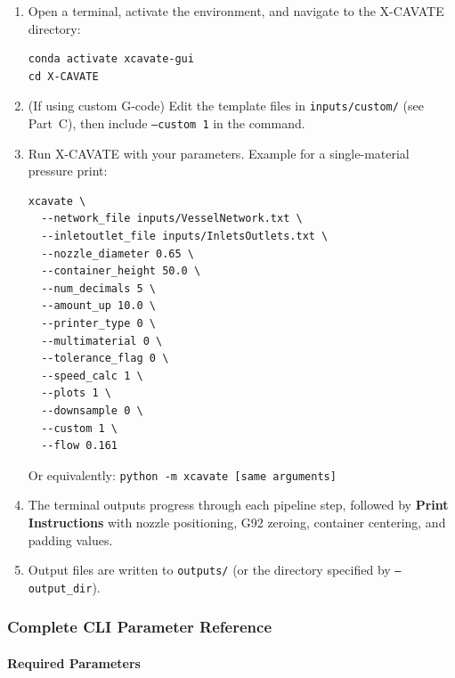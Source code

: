 \documentclass[11pt,letterpaper]{article}
\newcommand{\code}[1]{\texttt{#1}}
\begin{document}
\begin{enumerate}
    \item Open a terminal, activate the environment, and navigate to the X-CAVATE directory:
    \begin{lstlisting}
conda activate xcavate-gui
cd X-CAVATE
    \end{lstlisting}

    \item (If using custom G-code) Edit the template files in \code{inputs/custom/} (see Part~C), then include \code{--custom 1} in the command.

    \item Run X-CAVATE with your parameters. Example for a single-material pressure print:
    \begin{lstlisting}
xcavate \
  --network_file inputs/VesselNetwork.txt \
  --inletoutlet_file inputs/InletsOutlets.txt \
  --nozzle_diameter 0.65 \
  --container_height 50.0 \
  --num_decimals 5 \
  --amount_up 10.0 \
  --printer_type 0 \
  --multimaterial 0 \
  --tolerance_flag 0 \
  --speed_calc 1 \
  --plots 1 \
  --downsample 0 \
  --custom 1 \
  --flow 0.161
    \end{lstlisting}
    Or equivalently: \code{python -m xcavate [same arguments]}

    \item The terminal outputs progress through each pipeline step, followed by \textbf{Print Instructions} with nozzle positioning, G92 zeroing, container centering, and padding values.

    \item Output files are written to \code{outputs/} (or the directory specified by \code{--output\_dir}).
\end{enumerate}

\subsubsection{Complete CLI Parameter Reference}
\label{sec:cli-ref}

\paragraph{Required Parameters}
\end{document}
